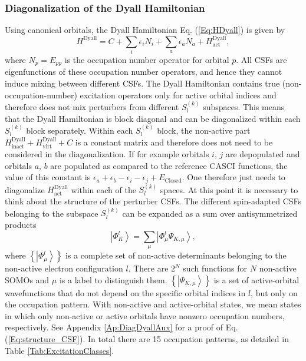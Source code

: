 \subsubsection{Diagonalization of the Dyall Hamiltonian}
\label{Sec:DiagDyall}
Using canonical orbitals, the Dyall Hamiltonian Eq. (\ref{Eq:HDyall}) is given by
\begin{equation}
H^\text{Dyall} = C + \sum_i \epsilon_i N_i + \sum_a \epsilon_a N_a + H^\text{Dyall}_\text{act},
\end{equation}
where $N_p = E_{pp}$ is the occupation number operator for orbital $p$. All CSFs are eigenfunctions of these occupation number operators, and hence they cannot induce mixing between different CSFs. The Dyall Hamiltonian contains true (non-occupation-number) excitation operators only for active orbital indices and therefore does not mix perturbers from different $S_l^{(k)}$ subspaces. This means that the Dyall Hamiltonian is block diagonal and can be diagonalized within each $S_l^{(k)}$ block separately. Within each $S_l^{(k)}$ block, the non-active part $H_{{\text{inact}}}^{{\text{Dyall}}} + H_{{\text{virt}}}^{{\text{Dyall}}} + C$ is a constant matrix and therefore does not need to be considered in the diagonalization. If for example orbitals $i$, $j$ are depopulated and orbitals $a$, $b$ are populated as compared to the reference CASCI functions, the value of this constant is $\epsilon_a+\epsilon_b-\epsilon_i-\epsilon_j+E_\text{Closed}$. One therefore just needs to diagonalize $H_{{\text{act}}}^{{\text{Dyall}}}$ within each of the $S_l^{(k)}$ spaces. At this point it is necessary to think about the structure of the perturber CSFs. The different spin-adapted CSFs belonging to the subspace $S_l^{(k)}$ can be expanded as a sum over antisymmetrized products
\begin{equation}
\label{Eq:structure_CSF}
\left| {\Phi _K^l} \right\rangle  = \sum\limits_\mu  {\left| {\Phi _\mu ^l\Psi _{K,\mu }^{}} \right\rangle }, 
\end{equation}									
where $\left\{ {\left| {\Phi _\mu ^l} \right\rangle } \right\}$ is a complete set of non-active determinants belonging to the non-active electron configuration $l$. There are $2^N$ such functions for $N$ non-active SOMOs and $\mu$ is a label to distinguish them. $\left\{ {\left| {\Psi _{K,\mu }^{}} \right\rangle } \right\}$ is a set of active-orbital wavefunctions that do not depend on the specific orbital indices in $l$, but only on the occupation pattern. With non-active and active-orbital states, we mean states in which only non-active or active orbitals have nonzero occupation numbers, respectively. See Appendix \ref{Ap:DiagDyallAux} for a proof of Eq. (\ref{Eq:structure_CSF}). In total there are 15 occupation patterns, as detailed in Table \ref{Tab:ExcitationClasses}.
